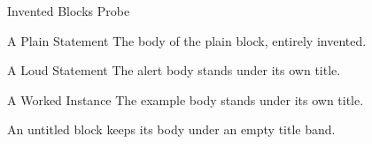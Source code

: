 \documentclass{slides}
\begin{document}
\begin{frame}{Invented Blocks Probe}
\begin{block}{A Plain Statement}
The body of the plain block, entirely invented.
\end{block}
\begin{alertblock}{A Loud Statement}
The alert body stands under its own title.
\end{alertblock}
\begin{exampleblock}{A Worked Instance}
The example body stands under its own title.
\end{exampleblock}
\begin{block}{}
An untitled block keeps its body under an empty title band.
\end{block}
\end{frame}
\end{document}
